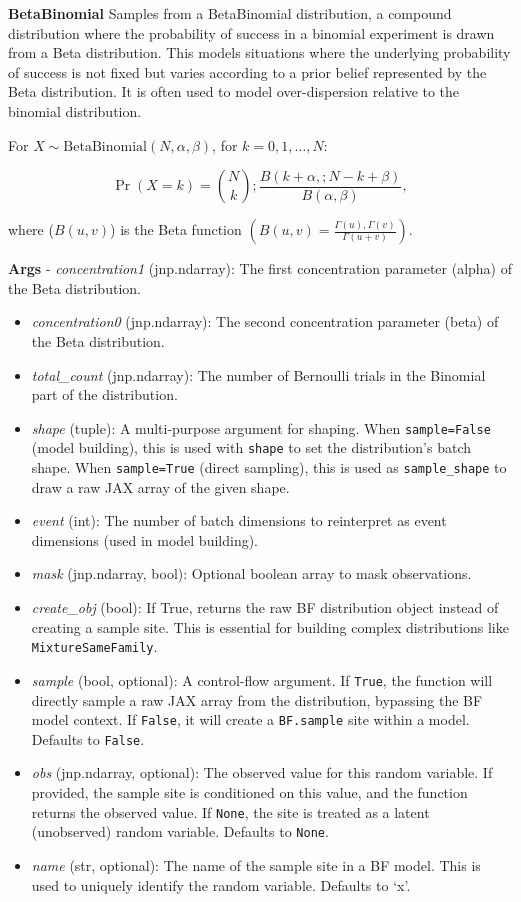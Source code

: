 \documentclass[
  letterpaper,
  DIV=11,
  numbers=noendperiod]{scrartcl}
\begin{document}
\textbf{BetaBinomial} Samples from a BetaBinomial distribution, a
compound distribution where the probability of success in a binomial
experiment is drawn from a Beta distribution. This models situations
where the underlying probability of success is not fixed but varies
according to a prior belief represented by the Beta distribution. It is
often used to model over-dispersion relative to the binomial
distribution.

For \(X \sim \mathrm{BetaBinomial}(N,\alpha,\beta)\), for
\(k = 0,1,\dots,N\):

\[
  \Pr(X = k) = \binom{N}{k} ; \frac{B(k + \alpha,; N - k + \beta)}{B(\alpha,\beta)},
  \]

where (\(B(u,v)\)) is the Beta function
\((B(u,v) = \frac{\Gamma(u),\Gamma(v)}{\Gamma(u+v)})\).

\textbf{Args} - \emph{concentration1} (jnp.ndarray): The first
concentration parameter (alpha) of the Beta distribution.

\begin{itemize}
\item
  \emph{concentration0} (jnp.ndarray): The second concentration
  parameter (beta) of the Beta distribution.
\item
  \emph{total\_count} (jnp.ndarray): The number of Bernoulli trials in
  the Binomial part of the distribution.
\item
  \emph{shape} (tuple): A multi-purpose argument for shaping. When
  \texttt{sample=False} (model building), this is used with
  \texttt{shape} to set the distribution's batch shape. When
  \texttt{sample=True} (direct sampling), this is used as
  \texttt{sample\_shape} to draw a raw JAX array of the given shape.
\item
  \emph{event} (int): The number of batch dimensions to reinterpret as
  event dimensions (used in model building).
\item
  \emph{mask} (jnp.ndarray, bool): Optional boolean array to mask
  observations.
\item
  \emph{create\_obj} (bool): If True, returns the raw BF distribution
  object instead of creating a sample site. This is essential for
  building complex distributions like \texttt{MixtureSameFamily}.
\item
  \emph{sample} (bool, optional): A control-flow argument. If
  \texttt{True}, the function will directly sample a raw JAX array from
  the distribution, bypassing the BF model context. If \texttt{False},
  it will create a \texttt{BF.sample} site within a model. Defaults to
  \texttt{False}.
\item
  \emph{obs} (jnp.ndarray, optional): The observed value for this random
  variable. If provided, the sample site is conditioned on this value,
  and the function returns the observed value. If \texttt{None}, the
  site is treated as a latent (unobserved) random variable. Defaults to
  \texttt{None}.
\item
  \emph{name} (str, optional): The name of the sample site in a BF
  model. This is used to uniquely identify the random variable. Defaults
  to `x'.
\end{itemize}
\end{document}
